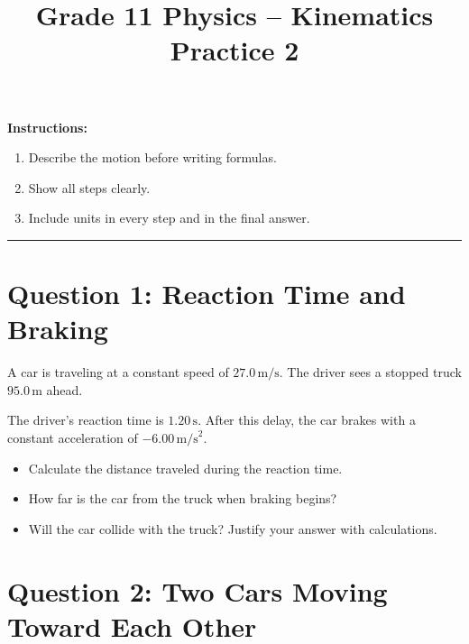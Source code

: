\documentclass[12pt]{article}
\begin{document}
\title{Grade 11 Physics -- Kinematics Practice 2}
\author{}
\date{}
\maketitle

\vspace{1em}

\textbf{Instructions:}

\begin{enumerate}
\item Describe the motion before writing formulas.
\item Show all steps clearly.
\item Include units in every step and in the final answer.
\end{enumerate}

\noindent\rule{\textwidth}{0.4pt}

\newpage

\section*{Question 1: Reaction Time and Braking}

A car is traveling at a constant speed of $27.0 \, \text{m/s}$. The driver sees a stopped truck $95.0 \, \text{m}$ ahead.

The driver's reaction time is $1.20 \, \text{s}$. After this delay, the car brakes with a constant acceleration of $-6.00 \, \text{m/s}^2$.

\begin{itemize}
\item[(a)] Calculate the distance traveled during the reaction time.
\vspace{6cm}

\item[(b)] How far is the car from the truck when braking begins?
\vspace{6cm}

\item[(c)] Will the car collide with the truck? Justify your answer with calculations.
\vspace{8cm}

\end{itemize}



\newpage
\section*{Question 2: Two Cars Moving Toward Each Other}
\end{document}
